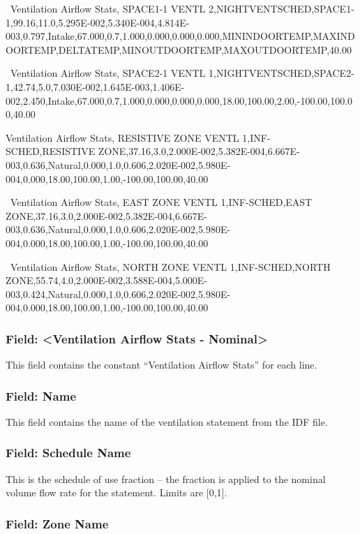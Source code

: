 ~Ventilation Airflow Stats, SPACE1-1 VENTL 2,NIGHTVENTSCHED,SPACE1-1,99.16,11.0,5.295E-002,5.340E-004,4.814E-003,0.797,Intake,67.000,0.7,1.000,0.000,0.000,0.000,MININDOORTEMP,MAXINDOORTEMP,DELTATEMP,MINOUTDOORTEMP,MAXOUTDOORTEMP,40.00

~Ventilation Airflow Stats, SPACE2-1 VENTL 1,NIGHTVENTSCHED,SPACE2-1,42.74,5.0,7.030E-002,1.645E-003,1.406E-002,2.450,Intake,67.000,0.7,1.000,0.000,0.000,0.000,18.00,100.00,2.00,-100.00,100.00,40.00

Ventilation Airflow Stats, RESISTIVE ZONE VENTL 1,INF-SCHED,RESISTIVE ZONE,37.16,3.0,2.000E-002,5.382E-004,6.667E-003,0.636,Natural,0.000,1.0,0.606,2.020E-002,5.980E-004,0.000,18.00,100.00,1.00,-100.00,100.00,40.00

~Ventilation Airflow Stats, EAST ZONE VENTL 1,INF-SCHED,EAST ZONE,37.16,3.0,2.000E-002,5.382E-004,6.667E-003,0.636,Natural,0.000,1.0,0.606,2.020E-002,5.980E-004,0.000,18.00,100.00,1.00,-100.00,100.00,40.00

~Ventilation Airflow Stats, NORTH ZONE VENTL 1,INF-SCHED,NORTH ZONE,55.74,4.0,2.000E-002,3.588E-004,5.000E-003,0.424,Natural,0.000,1.0,0.606,2.020E-002,5.980E-004,0.000,18.00,100.00,1.00,-100.00,100.00,40.00

\subsubsection{Field: \textless{}Ventilation Airflow Stats - Nominal\textgreater{}}\label{field-ventilation-airflow-stats---nominal}

This field contains the constant ``Ventilation Airflow Stats'' for each line.

\subsubsection{Field: Name}\label{field-name-7}

This field contains the name of the ventilation statement from the IDF file.

\subsubsection{Field: Schedule Name}\label{field-schedule-name-6}

This is the schedule of use fraction -- the fraction is applied to the nominal volume flow rate for the statement. Limits are {[}0,1{]}.

\subsubsection{Field: Zone Name}\label{field-zone-name-8}

